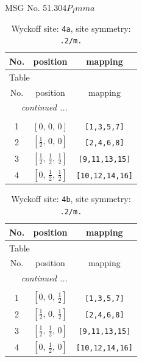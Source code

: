 \documentclass[fleqn,8pt]{jsarticle}
\begin{document}
\setcounter{MaxMatrixCols}{32}

\renewcommand{\tablename}{Table~}
\renewcommand{\figurename}{Figure~}
\begin{center}
\LARGE
MSG No. 51.304\quad$P_{I}mma$
\end{center}
\renewcommand{\arraystretch}{1.2}
\begin{longtable}{ccc}
\caption{Wyckoff site: {\tt 4a}, site symmetry: {\tt .2/m.}}
 \\
 \hline \hline
No. & position & mapping \\ \hline \endfirsthead

\multicolumn{2}{l}{\tablename\ \thetable{}} \\
 \hline \hline
No. & position & mapping \\ \hline \endhead

 \hline \hline
\multicolumn{2}{r}{\footnotesize\it continued ...} \\ \endfoot

 \hline \hline
\multicolumn{2}{r}{} \\ \endlastfoot

1 & $\left[ 0,\, 0,\, 0 \right]$ & {\tt [1,3,5,7]} \\ \hline
2 & $\left[ \frac{1}{2},\, 0,\, 0 \right]$ & {\tt [2,4,6,8]} \\ \hline
3 & $\left[ \frac{1}{2},\, \frac{1}{2},\, \frac{1}{2} \right]$ & {\tt [9,11,13,15]} \\ \hline
4 & $\left[ 0,\, \frac{1}{2},\, \frac{1}{2} \right]$ & {\tt [10,12,14,16]} \\
\end{longtable}
\renewcommand{\arraystretch}{1.2}
\begin{longtable}{ccc}
\caption{Wyckoff site: {\tt 4b}, site symmetry: {\tt .2/m.}}
 \\
 \hline \hline
No. & position & mapping \\ \hline \endfirsthead

\multicolumn{2}{l}{\tablename\ \thetable{}} \\
 \hline \hline
No. & position & mapping \\ \hline \endhead

 \hline \hline
\multicolumn{2}{r}{\footnotesize\it continued ...} \\ \endfoot

 \hline \hline
\multicolumn{2}{r}{} \\ \endlastfoot

1 & $\left[ 0,\, 0,\, \frac{1}{2} \right]$ & {\tt [1,3,5,7]} \\ \hline
2 & $\left[ \frac{1}{2},\, 0,\, \frac{1}{2} \right]$ & {\tt [2,4,6,8]} \\ \hline
3 & $\left[ \frac{1}{2},\, \frac{1}{2},\, 0 \right]$ & {\tt [9,11,13,15]} \\ \hline
4 & $\left[ 0,\, \frac{1}{2},\, 0 \right]$ & {\tt [10,12,14,16]} \\
\end{longtable}
\end{document}
